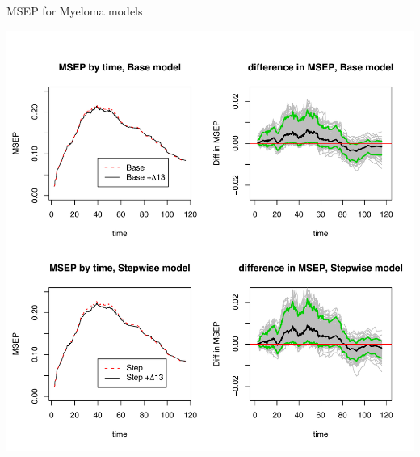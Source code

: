\documentclass[11pt]{beamer}
\begin{document}
\begin{frame}{MSEP for Myeloma models}
\vspace{-0.25in}
\begin{center}
\includegraphics[scale=0.40]{./figures/myeloma_msep_full.pdf}
\end{center}
\end{frame}
\end{document}
